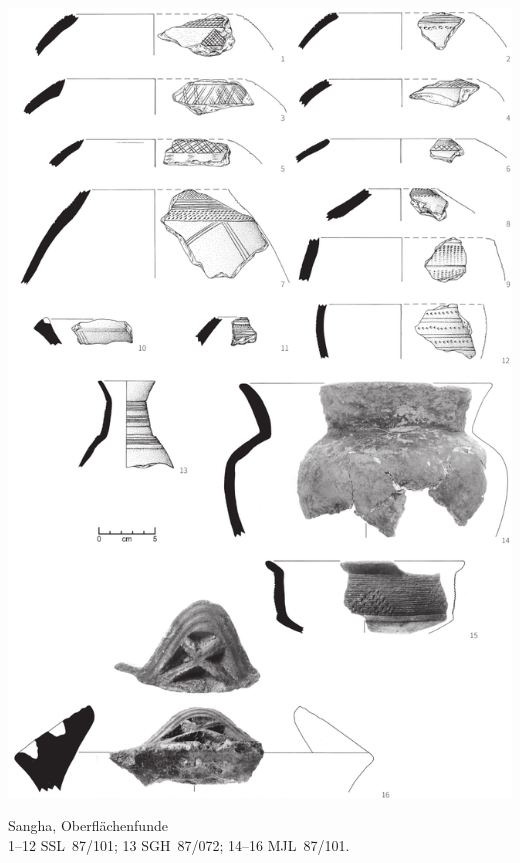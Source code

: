 \begin{pl}[H]
	\includegraphics{plt/Taf38.pdf}
	\vspace{.75em}\caption{\mbox{Sangha}, Oberflächenfunde \\ 1--12 SSL~87/101; 13 SGH~87/072; 14--16 MJL~87/101.}
	\label{pl:38}
\end{pl}

